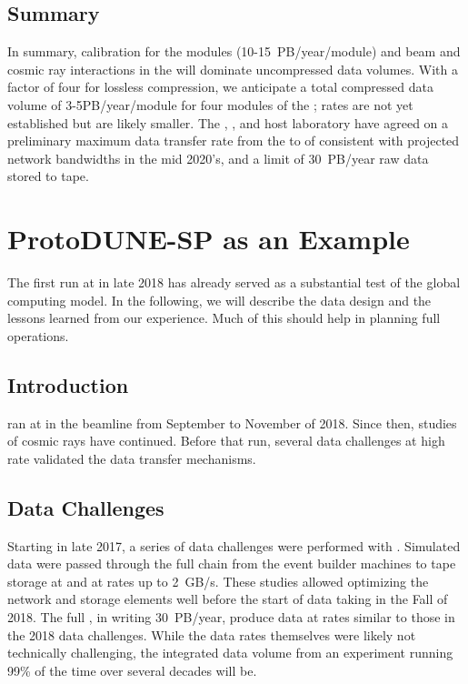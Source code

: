 \subsection{Summary}
\label{sec:exec-comp-summ}

In summary, calibration for the  modules (10-15~PB/year/module) and beam and cosmic ray interactions in the  will dominate uncompressed data volumes.  With a  factor of four for lossless compression, we anticipate a total compressed data volume of 3-5PB/year/module for four modules of the ;  rates are not yet established but are likely smaller.   
The ,   ,  and host laboratory %
have agreed on a preliminary maximum data transfer rate from the  to  of \surffnalbw consistent with projected network bandwidths in the mid 2020's, and a limit of \SI{30}{PB/year} raw data stored to tape. 

\section{ProtoDUNE-SP as an Example}
\label{sec:exec-comp-proto-SP}
The first   run at  in late 2018 has already served as a %
substantial test of the global computing model.  In the following, we will describe the  data design and the lessons learned from our experience. Much of this should help in planning full  operations. 

\subsection{Introduction}
\label{sec:exec-proto-intro}

 ran at  in the  beamline from September to November of 2018. Since then, studies of cosmic rays have continued. Before that run, several data challenges at high rate validated the data transfer mechanisms. 

\subsection{Data Challenges}

Starting in late 2017, a series of data challenges were performed with .  Simulated data were passed through the full chain from the event builder machines to tape storage at  and  at rates up to \SI{2}{GB/s}.  These studies allowed optimizing the network and storage elements well before the start of data taking in the Fall of 2018. 
The full  , in writing \SI{30}{PB/year}, produce data at rates similar to  those in the 2018 data challenges. While the data rates themselves were likely not technically challenging, the integrated data volume from an experiment running 99\% of the time over several decades will be. 

